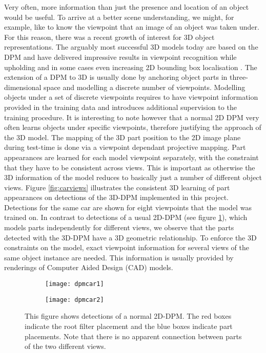 Very often, more information than just the presence and location of an object would be useful. To arrive at a better scene understanding, we might, for example, like to know the viewpoint that an image of an object was taken under. For this reason, there was a recent growth of interest for 3D object representations. The arguably most successful 3D models today are based on the DPM and have delivered impressive results in viewpoint recognition while upholding and in some cases even increasing 2D bounding box localisation \cite{6248075,Pepik:2012aa}. The extension of a DPM to 3D is usually done by anchoring object parts in three-dimensional space and modelling a discrete number of viewpoints. Modelling objects under a set of discrete viewpoints requires to have viewpoint information provided in the training data and introduces additional supervision to the training procedure. It is interesting to note however that a normal 2D DPM very often learns objects under specific viewpoints, therefore justifying the approach of the 3D model. The mapping of the 3D part position to the 2D image plane during test-time is done via a viewpoint dependant projective mapping. Part appearances are learned for each model viewpoint separately, with the constraint that they have to be consistent across views. This is important as otherwise the 3D information of the model reduces to basically just a number of different object views. Figure \ref{fig:carviews} illustrates the consistent 3D learning of part appearances on detections of the 3D-DPM implemented in this project. Detections for the same car are shown for eight viewpoints that the model was trained on. In contrast to detections of a usual 2D-DPM (see figure \ref{fig:dpmcar}), which models parts independently for different views, we observe that the parts detected with the 3D-DPM have a 3D geometric relationship. To enforce the 3D constraints on the model, exact viewpoint information for several views of the same object instance are needed. This information is usually provided by  renderings of Computer Aided Design (CAD) models. 


\begin{figure}
\begin{center}
        \begin{subfigure}[b]{0.49\textwidth}
                \texttt{[image: dpmcar1]}
        \end{subfigure}
        \begin{subfigure}[b]{0.49\textwidth}
               \texttt{[image: dpmcar2]}
        \end{subfigure}              
\caption{This figure shows detections of a normal 2D-DPM. The red boxes indicate the root filter placement and the blue boxes indicate part placements. Note that there is no apparent connection between parts of the two different views.}
\label{fig:dpmcar}
\end{center}
\end{figure}

